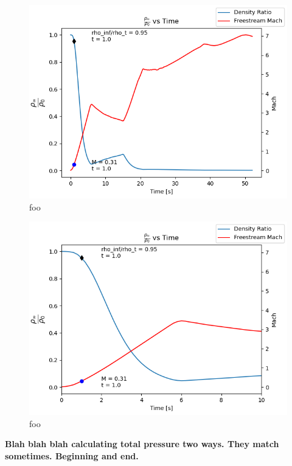 \documentclass[../main.tex]{subfiles}
\begin{document}
\begin{figure}[h]
    \centering
    \includegraphics[scale=.7]{../../images/problem_1/rho_rho_t_and_Mach_vs_Time_marked.png}
    \caption{foo}
    \label{rho_rho_t_vs_Mach}
\end{figure}

\begin{figure}[h]
    \centering
    \includegraphics[scale=.7]{../../images/problem_1/rho_rho_t_and_Mach_vs_Time_marked_zoom.png}
    \caption{foo}
    \label{rho_rho_t_vs_Mach}
\end{figure}

\textbf{Blah blah blah calculating total pressure two ways.
They match sometimes. 
Beginning and end.}
\end{document}
